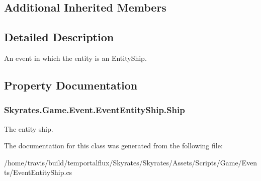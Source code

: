 \subsection*{Additional Inherited Members}


\subsection{Detailed Description}
An event in which the entity is an Entity\-Ship. 



\subsection{Property Documentation}
\hypertarget{class_skyrates_1_1_game_1_1_event_1_1_event_entity_ship_a93b99ed8de4ecf3fd40a46628f48e318}{
\subsubsection[{Ship}]{ Skyrates.\-Game.\-Event.\-Event\-Entity\-Ship.\-Ship\hspace{0.3cm}{\ttfamily [get]}}}\label{class_skyrates_1_1_game_1_1_event_1_1_event_entity_ship_a93b99ed8de4ecf3fd40a46628f48e318}


The entity ship. 



The documentation for this class was generated from the following file\-:\begin{DoxyCompactItemize}
\item 
/home/travis/build/temportalflux/\-Skyrates/\-Skyrates/\-Assets/\-Scripts/\-Game/\-Events/Event\-Entity\-Ship.\-cs\end{DoxyCompactItemize}
